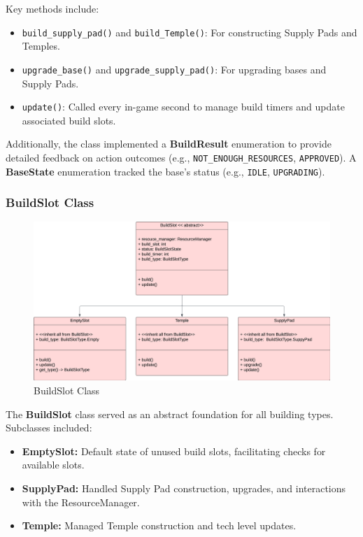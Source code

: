 \documentclass[a4paper, 12pt, english]{article}
\begin{document}
Key methods include:
\begin{itemize}
    \item \texttt{build\_supply\_pad()} and \texttt{build\_Temple()}: For constructing Supply Pads and Temples.
    \item \texttt{upgrade\_base()} and \texttt{upgrade\_supply\_pad()}: For upgrading bases and Supply Pads.
    \item \texttt{update()}: Called every in-game second to manage build timers and update associated build slots.
\end{itemize}

Additionally, the class implemented a \textbf{BuildResult} enumeration to provide detailed feedback on action outcomes (e.g., \texttt{NOT\_ENOUGH\_RESOURCES}, \texttt{APPROVED}). A \textbf{BaseState} enumeration tracked the base's status (e.g., \texttt{IDLE}, \texttt{UPGRADING}).  
\newline


\subsubsection{BuildSlot Class}
\begin{figure}[!ht]
    \begin{center}
        \includegraphics[width=150mm,scale=1.0]{HaloWarsDiagramBuildSlots.png}
    \end{center}
    \caption{\label{fig:BuildSlotClass}BuildSlot Class}
\end{figure}

The \textbf{BuildSlot} class served as an abstract foundation for all building types. Subclasses included:
\begin{itemize}
    \item \textbf{EmptySlot:} Default state of unused build slots, facilitating checks for available slots.
    \item \textbf{SupplyPad:} Handled Supply Pad construction, upgrades, and interactions with the ResourceManager.
    \item \textbf{Temple:} Managed Temple construction and tech level updates.
\end{itemize}
\end{document}
